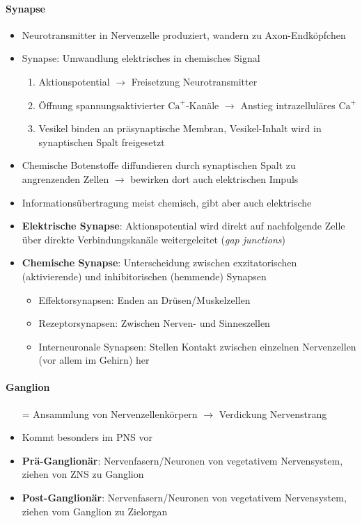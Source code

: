\paragraph{Synapse}
\begin{itemize}
  \item Neurotransmitter in Nervenzelle produziert, wandern zu Axon-Endköpfchen
  \item Synapse: Umwandlung elektrisches in chemisches Signal
  \begin{enumerate}
    \item Aktionspotential \( \to \) Freisetzung Neurotransmitter
    \item Öffnung spannungsaktivierter \( \text{Ca}^+ \)-Kanäle \( \to \) Anstieg intrazelluläres \( \text{Ca}^+ \)
    \item Vesikel binden an präsynaptische Membran, Vesikel-Inhalt wird in synaptischen Spalt freigesetzt
  \end{enumerate}
  \item Chemische Botenstoffe diffundieren durch synaptischen Spalt zu angrenzenden Zellen \( \to \) bewirken dort auch elektrischen Impuls
  \item Informationsübertragung meist chemisch, gibt aber auch elektrische
  \item \textbf{Elektrische Synapse}: Aktionspotential wird direkt auf nachfolgende Zelle über direkte Verbindungskanäle weitergeleitet (\emph{gap junctions})
  \item \textbf{Chemische Synapse}: Unterscheidung zwischen exzitatorischen (aktivierende) und inhibitorischen (hemmende) Synapsen
  \begin{itemize}
    \item Effektorsynapsen: Enden an Drüsen/Muskelzellen
    \item Rezeptorsynapsen: Zwischen Nerven- und Sinneszellen
    \item Interneuronale Synapsen: Stellen Kontakt zwischen einzelnen Nervenzellen (vor allem im Gehirn) her
  \end{itemize}
\end{itemize}

\paragraph{Ganglion}
\begin{itemize}
  \item[=] Ansammlung von Nervenzellenkörpern \( \to \) Verdickung Nervenstrang
  \item Kommt besonders im PNS vor
  \item \textbf{Prä-Ganglionär}: Nervenfasern/Neuronen von vegetativem Nervensystem, ziehen von ZNS zu Ganglion
  \item \textbf{Post-Ganglionär}: Nervenfasern/Neuronen von vegetativem Nervensystem, ziehen vom Ganglion zu Zielorgan 
\end{itemize}


